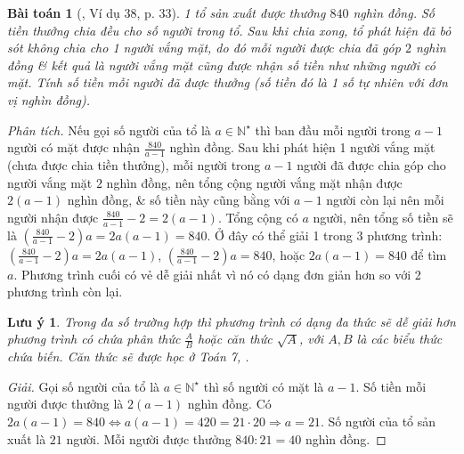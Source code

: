 \documentclass{article}
\numberwithin{equation}{section}
\newtheorem{baitoan}{Bài toán}[section]
\newtheorem{luuy}{Lưu ý}[section]
\begin{document}
\begin{baitoan}[\cite{Binh_Toan_6_tap_1}, Ví dụ 38, p. 33]
	1 tổ sản xuất được thưởng $840$ nghìn đồng. Số tiền thưởng chia đều cho số người trong tổ. Sau khi chia xong, tổ phát hiện đã bỏ sót không chia cho 1 người vắng mặt, do đó mỗi người được chia đã góp $2$ nghìn đồng \& kết quả là người vắng mặt cũng được nhận số tiền như những người có mặt. Tính số tiền mỗi người đã được thưởng (số tiền đó là 1 số tự nhiên với đơn vị nghìn đồng).
\end{baitoan}
\noindent\textit{Phân tích.} Nếu gọi số người của tổ là $a\in\mathbb{N}^\star$ thì ban đầu mỗi người trong $a - 1$ người có mặt được nhận $\frac{840}{a - 1}$ nghìn đồng. Sau khi phát hiện 1 người vắng mặt (chưa được chia tiền thưởng), mỗi người trong $a - 1$ người đã được chia góp cho người vắng mặt $2$ nghìn đồng, nên tổng cộng người vắng mặt nhận được $2(a - 1)$ nghìn đồng, \& số tiền này cũng bằng với $a - 1$ người còn lại nên mỗi người nhận được $\frac{840}{a - 1} - 2 = 2(a - 1)$. Tổng cộng có $a$ người, nên tổng số tiền sẽ là $\left(\frac{840}{a - 1} - 2\right)a = 2a(a - 1) = 840$. Ở đây có thể giải 1 trong 3 phương trình: $\left(\frac{840}{a - 1} - 2\right)a = 2a(a - 1)$, $\left(\frac{840}{a - 1} - 2\right)a = 840$, hoặc $2a(a - 1) = 840$ để tìm $a$. Phương trình cuối có vẻ dễ giải nhất vì nó có dạng đơn giản hơn so với 2 phương trình còn lại.

\begin{luuy}
	Trong đa số trường hợp thì phương trình có dạng đa thức sẽ dễ giải hơn phương trình có chứa phân thức $\frac{A}{B}$ hoặc căn thức $\sqrt{A}$, với $A,B$ là các biểu thức chứa biến. Căn thức sẽ được học ở Toán 7, \cite{SGK_Toan_7_Canh_Dieu_tap_1}.
\end{luuy}

\begin{proof}[Giải]
	Gọi số người của tổ là $a\in\mathbb{N}^\star$ thì số người có mặt là $a - 1$. Số tiền mỗi người được thưởng là $2(a - 1)$ nghìn đồng. Có $2a(a - 1) = 840\Leftrightarrow a(a - 1) = 420 = 21\cdot 20$$\Rightarrow a = 21$. Số người của tổ sản xuất là $21$ người. Mỗi người được thưởng $840:21 = 40$ nghìn đồng.
\end{proof}
\end{document}
